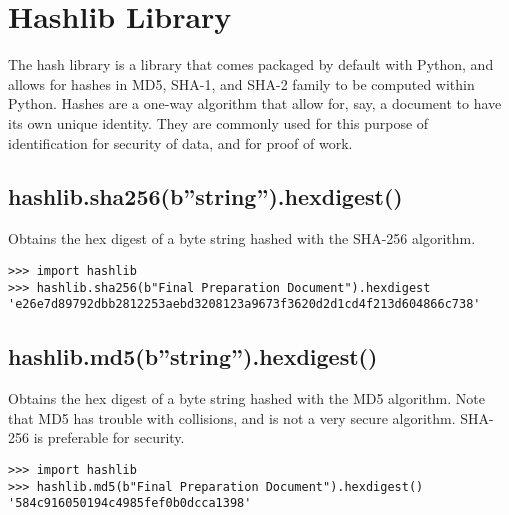 \chapter{Hashlib Library}


The hash library is a library that comes packaged by default with
Python, and allows for hashes in MD5, SHA-1, and SHA-2 family to be
computed within Python. Hashes are a one-way algorithm that allow
for, say, a document to have its own unique identity. They are commonly
used for this purpose of identification for security of data, and
for proof of work.


\section{hashlib.sha256(b''string'').hexdigest()}

Obtains the hex digest of a byte string hashed with the SHA-256 algorithm.

\begin{verbatim}
>>> import hashlib 
>>> hashlib.sha256(b"Final Preparation Document").hexdigest 
'e26e7d89792dbb2812253aebd3208123a9673f3620d2d1cd4f213d604866c738'
\end{verbatim}



\section{hashlib.md5(b''string'').hexdigest()}

Obtains the hex digest of a byte string hashed with the MD5 algorithm.
Note that MD5 has trouble with collisions, and is not a very secure
algorithm. SHA-256 is preferable for security.

\begin{verbatim}
>>> import hashlib 
>>> hashlib.md5(b"Final Preparation Document").hexdigest() 
'584c916050194c4985fef0b0dcca1398'
\end{verbatim}

